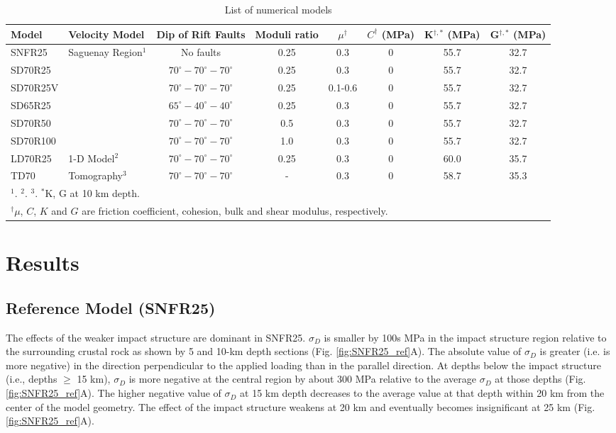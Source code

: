 \documentclass[draft]{agujournal2018}
\begin{document}
\begin{table}
\caption{List of numerical models} 
\centering
\begin{tabular}{llcccccc}
\hline
Model & Velocity Model & Dip of Rift Faults & Moduli ratio & $\mu^{\dagger}$ & $C^{\dagger}$ (MPa) & K$^{\dagger,*}$ (MPa) & G$^{\dagger,*}$ (MPa) \\
\hline
SNFR25  & Saguenay Region$^{1}$ & No faults & 0.25 & 0.3 & 0 & 55.7 & 32.7  \\
SD70R25  &  & $70^\circ-70^\circ-70^\circ$  & 0.25 & 0.3 & 0 & 55.7 & 32.7 \\
SD70R25V  &  & $70^\circ-70^\circ-70^\circ$  & 0.25 & 0.1-0.6 & 0 & 55.7 & 32.7 \\
SD65R25  &  & $65^\circ-40^\circ-40^\circ$  & 0.25 & 0.3 & 0 & 55.7 & 32.7\\
SD70R50  &  & $70^\circ-70^\circ-70^\circ$  & 0.5 & 0.3 & 0 & 55.7 & 32.7 \\
SD70R100   &  & $70^\circ-70^\circ-70^\circ$  & 1.0 & 0.3 & 0 & 55.7 & 32.7 \\
LD70R25 & 1-D Model$^{2}$ & $70^\circ-70^\circ-70^\circ$ & 0.25 & 0.3  & 0 & 60.0 & 35.7 \\
TD70 & Tomography$^{3}$ & $70^\circ-70^\circ-70^\circ$ & - & 0.3 & 0 & 58.7 & 35.3 \\
\hline
\multicolumn{8}{l}{$^{1}$\citet{Somerville1990}. $^{2}$\citet{lamontagne1999}. $^{3}$\citet{Powell_2017}. $^{*}$K, G at 10 km depth.} \\
\multicolumn{8}{l}{$^{\dagger}$$\mu$, $C$, $K$ and $G$ are friction coefficient, cohesion, bulk and shear modulus, respectively.}

\end{tabular}
\label{tableone}
\end{table}



\section{Results}

\subsection{Reference Model (SNFR25)} \label{Ref_Model}
The effects of the weaker impact structure are dominant in SNFR25. $\sigma_D$ is smaller by 100s MPa in the impact structure region relative to the surrounding crustal rock as shown by 5 and 10-km depth sections (Fig. \ref{fig:SNFR25_ref}A). The absolute value of $\sigma_D$ is greater (i.e. is more negative) in the direction perpendicular to the applied loading than in the parallel direction. At depths below the impact structure (i.e., depths $\ge$ 15 km), $\sigma_D$ is more negative at the central region by about 300 MPa relative to the average $\sigma_D$ at those depths (Fig. \ref{fig:SNFR25_ref}A). The higher negative value of $\sigma_D$ at 15 km depth decreases to the average value at that depth within 20 km from the center of the model geometry. The effect of the impact structure weakens at 20 km and eventually becomes insignificant at 25 km (Fig. \ref{fig:SNFR25_ref}A).
\end{document}
